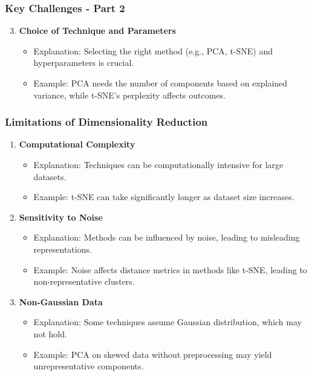 \documentclass[aspectratio=169]{beamer}
\begin{document}
\begin{frame}[fragile]
  \frametitle{Key Challenges - Part 2}
  \begin{enumerate}
    \setcounter{enumi}{2} %
    \item \textbf{Choice of Technique and Parameters}
      \begin{itemize}
        \item Explanation: Selecting the right method (e.g., PCA, t-SNE) and hyperparameters is crucial.
        \item Example: PCA needs the number of components based on explained variance, while t-SNE's perplexity affects outcomes.
      \end{itemize}
  \end{enumerate}
\end{frame}

\begin{frame}[fragile]
  \frametitle{Limitations of Dimensionality Reduction}
  \begin{enumerate}
    \item \textbf{Computational Complexity}
      \begin{itemize}
        \item Explanation: Techniques can be computationally intensive for large datasets.
        \item Example: t-SNE can take significantly longer as dataset size increases.
      \end{itemize}

    \item \textbf{Sensitivity to Noise}
      \begin{itemize}
        \item Explanation: Methods can be influenced by noise, leading to misleading representations.
        \item Example: Noise affects distance metrics in methods like t-SNE, leading to non-representative clusters.
      \end{itemize}
    
    \item \textbf{Non-Gaussian Data}
      \begin{itemize}
        \item Explanation: Some techniques assume Gaussian distribution, which may not hold.
        \item Example: PCA on skewed data without preprocessing may yield unrepresentative components.
      \end{itemize}
  \end{enumerate}
\end{frame}
\end{document}
